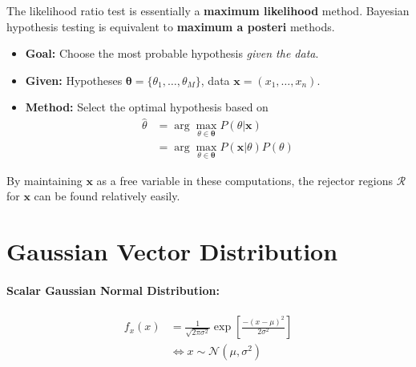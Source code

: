 \documentclass[a4paper,12pt]{report}
\begin{document}
The likelihood ratio test is essentially a \textbf{maximum likelihood} method. Bayesian hypothesis testing is equivalent to \textbf{maximum a posteri} methods.

\begin{itemize}
\item \textbf{Goal: } Choose the most probable hypothesis \textit{given the data}.
\item \textbf{Given: } Hypotheses $\pmb \theta = \{\theta_1, \dots, \theta_M\}$, data $\pmb x = (x_1, \dots, x_n)$.
\item \textbf{Method: } Select the optimal hypothesis based on 
\begin{equation}
\begin{split}
\hat \theta &= \arg\max_{\theta\in \pmb \theta} P(\theta | \pmb x) \\
&= \arg\max_{\theta\in \pmb \theta} P(\pmb x | \theta)P(\theta)
\end{split}
\end{equation}
\end{itemize}

By maintaining $\pmb x$ as a free variable in these computations, the rejector regions $\mathcal R$ for $\pmb x$ can be found relatively easily.


\section{Gaussian Vector Distribution}

\paragraph{Scalar Gaussian Normal Distribution: } 
\begin{equation}
\begin{split}
f_x(x) &= \frac{1}{\sqrt{2\pi\sigma^2}} \exp[\frac{-(x-\mu)^2}{2\sigma^2}] \\
&\Leftrightarrow x \sim \mathcal N(\mu, \sigma^2)
\end{split}
\end{equation}
\end{document}
